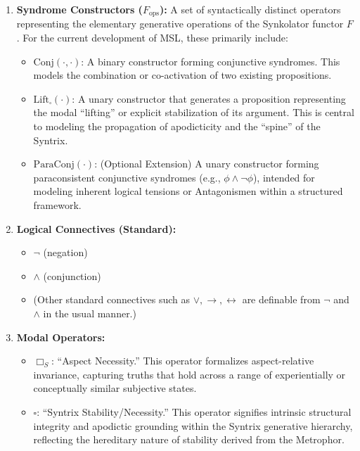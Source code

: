 \documentclass[
    12pt,              %
    a4paper,           %
    headings=normal,   %
    twoside=true,      %
    BCOR=8mm,          %
]{scrbook}
\newcommand{\q}[1]{\enquote{#1}}
\newcommand{\BoxS}{\Box_S}
\newcommand{\BoxSyn}{\square}
\newcommand{\fops}{F_{\text{ops}}}
\begin{document}
\begin{enumerate}[label=\arabic*.]
    \item  \textbf{Syndrome Constructors (\(\fops\)):}
        A set of syntactically distinct operators representing the elementary generative operations of the Synkolator functor \(F\). For the current development of MSL, these primarily include:
        \begin{itemize}
            \item   \(\text{Conj}(\cdot, \cdot)\): A binary constructor forming conjunctive syndromes. This models the combination or co-activation of two existing propositions.
            \item   \(\text{Lift}_\BoxSyn(\cdot)\): A unary constructor that generates a proposition representing the modal \q{lifting} or explicit stabilization of its argument. This is central to modeling the propagation of apodicticity and the \q{spine} of the Syntrix.
            \item   \(\text{ParaConj}(\cdot)\): (Optional Extension) A unary constructor forming paraconsistent conjunctive syndromes (e.g., \(\phi \land \neg\phi\)), intended for modeling inherent logical tensions or Antagonismen within a structured framework.
        \end{itemize}

    \item  \textbf{Logical Connectives (Standard):}
        \begin{itemize}
            \item   \(\neg\) (negation)
            \item   \(\land\) (conjunction)
            \item   (Other standard connectives such as \(\lor, \rightarrow, \leftrightarrow\) are definable from \(\neg\) and \(\land\) in the usual manner.)
        \end{itemize}

    \item  \textbf{Modal Operators:}
        \begin{itemize}
            \item   \(\BoxS\): \q{Aspect Necessity.} This operator formalizes aspect-relative invariance, capturing truths that hold across a range of experientially or conceptually similar subjective states.
            \item   \(\BoxSyn\): \q{Syntrix Stability/Necessity.} This operator signifies intrinsic structural integrity and apodictic grounding within the Syntrix generative hierarchy, reflecting the hereditary nature of stability derived from the Metrophor.
        \end{itemize}


\end{enumerate}
\end{document}
